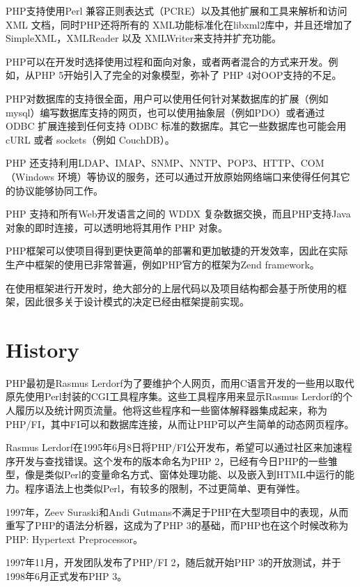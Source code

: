PHP支持使用Perl 兼容正则表达式（PCRE）以及其他扩展和工具来解析和访问 XML 文档，同时PHP还将所有的 XML功能标准化在libxml2库中，并且还增加了 SimpleXML，XMLReader 以及 XMLWriter来支持并扩充功能。


PHP可以在开发时选择使用过程和面向对象，或者两者混合的方式来开发。例如，从PHP 5开始引入了完全的对象模型，弥补了 PHP 4对OOP支持的不足。

PHP对数据库的支持很全面，用户可以使用任何针对某数据库的扩展（例如 mysql）编写数据库支持的网页，也可以使用抽象层（例如PDO）或者通过 ODBC 扩展连接到任何支持 ODBC 标准的数据库。其它一些数据库也可能会用 cURL 或者 sockets（例如 CouchDB）。



PHP 还支持利用LDAP、IMAP、SNMP、NNTP、POP3、HTTP、COM（Windows 环境）等协议的服务，还可以通过开放原始网络端口来使得任何其它的协议能够协同工作。

PHP 支持和所有Web开发语言之间的 WDDX 复杂数据交换，而且PHP支持Java 对象的即时连接，可以透明地将其用作 PHP 对象。


PHP框架可以使项目得到更快更简单的部署和更加敏捷的开发效率，因此在实际生产中框架的使用已非常普遍，例如PHP官方的框架为Zend framework。

在使用框架进行开发时，绝大部分的上层代码以及项目结构都会基于所使用的框架，因此很多关于设计模式的决定已经由框架提前实现。



\section{History}




PHP最初是Rasmus Lerdorf为了要维护个人网页，而用C语言开发的一些用以取代原先使用Perl封装的CGI工具程序集。这些工具程序用来显示Rasmus Lerdorf的个人履历以及统计网页流量。他将这些程序和一些窗体解释器集成起来，称为PHP/FI，其中FI可以和数据库连接，从而让PHP可以产生简单的动态网页程序。

Rasmus Lerdorf在1995年6月8日将PHP/FI公开发布，希望可以通过社区来加速程序开发与查找错误。这个发布的版本命名为PHP 2，已经有今日PHP的一些雏型，像是类似Perl的变量命名方式、窗体处理功能、以及嵌入到HTML中运行的能力。程序语法上也类似Perl，有较多的限制，不过更简单、更有弹性。

1997年，Zeev Suraski和Andi Gutmans不满足于PHP在大型项目中的表现，从而重写了PHP的语法分析器，这成为了PHP 3的基础，而PHP也在这个时候改称为PHP: Hypertext Preprocessor。

1997年11月，开发团队发布了PHP/FI 2，随后就开始PHP 3的开放测试，并于1998年6月正式发布PHP 3。

